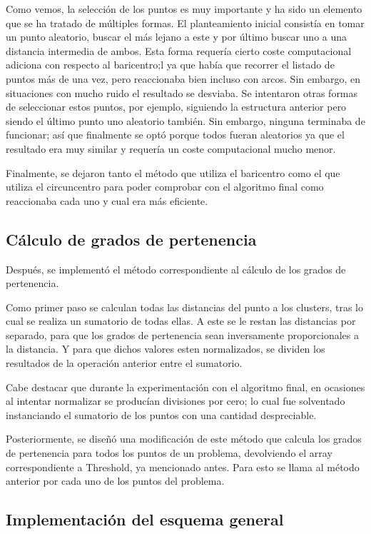 \documentclass[conference,a4paper]{IEEEtran}
\begin{document}
Como vemos, la selección de los puntos es muy importante y ha sido un elemento que se ha tratado de múltiples formas. El planteamiento inicial  consistía en tomar un punto aleatorio, buscar el más lejano a este y por último buscar uno a una distancia intermedia de ambos. Esta forma requería cierto coste computacional adiciona con respecto al baricentro;l ya que había que recorrer el listado de puntos más de una vez, pero reaccionaba bien incluso con arcos. Sin embargo, en situaciones con mucho ruido el resultado se desviaba. Se intentaron otras formas de seleccionar estos puntos, por ejemplo, siguiendo la estructura anterior pero siendo el último punto uno aleatorio también. Sin embargo, ninguna terminaba de funcionar; así que finalmente se optó porque todos fueran aleatorios ya que el resultado era muy similar y requería un coste computacional mucho menor.

Finalmente, se dejaron tanto el método que utiliza el baricentro como el que utiliza el circuncentro para poder comprobar con el algoritmo final como reaccionaba cada uno y cual era más eficiente.

\subsection{Cálculo de grados de pertenencia}

Después, se implementó el método correspondiente al cálculo de los grados de pertenencia.

Como primer paso se calculan todas las distancias del punto a los clusters, tras lo cual se realiza un sumatorio de todas ellas. A este se le restan las distancias por separado, para que los grados de pertenencia sean inversamente proporcionales a la distancia. Y para que dichos valores esten normalizados, se dividen los resultados de la operación anterior entre el sumatorio.

Cabe destacar que durante la experimentación con el algoritmo final, en ocasiones al intentar normalizar se producían divisiones por cero; lo cual fue solventado instanciando el sumatorio de los puntos con una cantidad despreciable.

Posteriormente, se diseñó una modificación de este método que calcula los grados de pertenencia para todos los puntos de un problema, devolviendo el array correspondiente a Threshold, ya mencionado antes. Para esto se llama al método anterior por cada uno de los puntos del problema.

\subsection{Implementación del esquema general}
\end{document}
